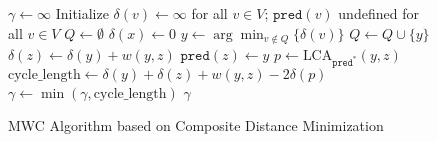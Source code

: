 \documentclass{article}
\newcommand{\ta}[1]{\textcolor{blue}{\textit{(TA: {#1})}}}
\begin{document}
\begin{figure}[htbp]
    \centering
    \begin{minipage}{0.9\linewidth}
        \begin{algorithm}[H]
            \caption{MWC Algorithm based on Composite Distance Minimization}
            \label{alg:MWC_Dijkstra}
            \begin{algorithmic}[1]
                \State $\gamma \gets \infty$ 
                    \State Initialize $\delta(v) \gets \infty$ for all $v \in V$; $\texttt{pred}(v)$ undefined for all $v \in V$
                    \State $Q \leftarrow \emptyset$ 
                    \State $\delta(x) \leftarrow 0$
                     \label{line:while_condition} 
                        \State $y \leftarrow \arg\min_{v \notin Q} \{\delta(v)\}$ 
                        \State $Q \leftarrow Q \cup \{y\}$
                             
                                    \State $\delta(z) \leftarrow \delta(y) + w(y,z)$
                                    \State $\texttt{pred}(z) \leftarrow y$
                                \EndIf
                              \label{line:cycle_check}
                                \State $p \leftarrow \text{LCA}_{\texttt{pred}^*}(y, z)$  %
                                    \State $\text{cycle\_length} \leftarrow \delta(y) + \delta(z) + w(y,z)-2\delta(p)$ \label{line:cycle_length_calc}
                                    \State $\gamma \leftarrow \min(\gamma, \text{cycle\_length})$ \label{line:gamma_update}
                                \EndIf
                        \EndFor
                    \EndWhile
                \EndFor
                \State \Return $\gamma$
            \end{algorithmic}
        \end{algorithm}
    \end{minipage}
\end{figure}
\end{document}
